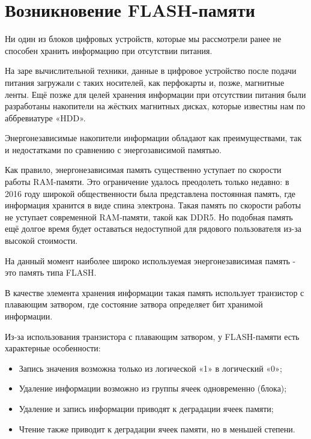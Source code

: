 \documentclass[a5paper, DIV=14, headings=openany, twoside=true,fontsize=10pt, titlepage]{scrreprt}
\newcommand{\quotes}[1]{«#1»}
\newcommand{\eng}[1]{\foreignlanguage{english}{#1}}
\newcommand{\qeng}[1]{\quotes{\foreignlanguage{english}{#1}}}
\begin{document}
\section{Возникновение \eng{FLASH}-памяти}
\par{Ни один из блоков цифровых устройств, которые мы рассмотрели ранее не способен хранить информацию при отсутствии питания.}
\par{На заре вычислительной техники, данные в цифровое устройство после подачи питания загружали с таких носителей, как перфокарты и, позже, магнитные ленты. Ещё позже для целей хранения информации при отсутствии питания были разработаны накопители на жёстких магнитных дисках, которые известны нам по аббревиатуре \qeng{HDD}.}
\par{Энергонезависимые накопители информации обладают как преимуществами, так и недостатками по сравнению с энергозависимой памятью.} 
\par{Как правило, энергонезависимая память существенно уступает по скорости работы \eng{RAM}-памяти. Это ограничение удалось преодолеть только недавно: в 2016 году широкой общественности была представлена постоянная память, где информация хранится в виде спина электрона. Такая память по скорости работы не уступает современной \eng{RAM}-памяти, такой как \eng{DDR5}. Но подобная память ещё долгое время будет оставаться недоступной для рядового пользователя из-за высокой стоимости.}
\par{На данный момент наиболее широко используемая энергонезависимая память - это память типа \eng{FLASH}.}
\par{В качестве элемента хранения информации такая память использует транзистор с плавающим затвором, где состояние затвора определяет бит хранимой информации.}
%
\begin{samepage}
\par{Из-за использования транзистора с плавающим затвором, у \eng{FLASH}-памяти есть характерные особенности:
  \begin{itemize}
    \item Запись значения возможна только из логической \quotes{1} в логический \quotes{0};
    \item Удаление информации возможно из группы ячеек одновременно (блока);
    \item Удаление и запись информации приводят к деградации ячеек памяти;
    \item Чтение также приводит к деградации ячеек памяти, но в меньшей степени.
  \end{itemize}}
\end{samepage}
\end{document}
